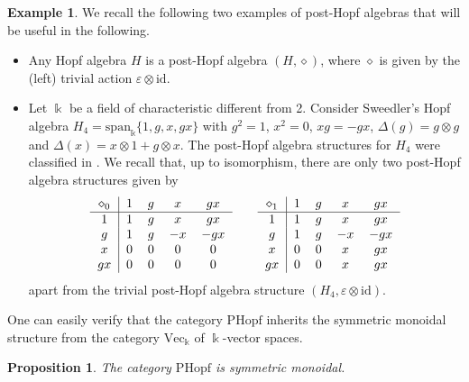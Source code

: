 \documentclass[10pt]{article}
\newtheorem {proposition} [lemma] {Proposition}
\theoremstyle{definition}
\newtheorem{example}[lemma]{Example}
\renewcommand{\wp}{\diamond}
\newcommand{\ot}{\otimes}
\begin{document}
\begin{example}\label{ex:SweedlerpostHopf}
We recall the following two examples of post-Hopf algebras that will be useful in the following.
\begin{itemize}
    \item[1)] Any Hopf algebra $H$ is a post-Hopf algebra $(H,\wp)$, where $\wp$ is given by the (left) trivial action $\varepsilon\ot\mathrm{id}$. %
    \item[2)] Let $\Bbbk$ be a field of characteristic different from 2. Consider Sweedler's Hopf algebra $H_4=\mathrm{span}_\Bbbk\{1,g,x,gx\}$ with $g^2=1$, $x^2=0$, $xg=-gx$, $\Delta(g)=g\otimes g$ and $\Delta(x)=x\otimes 1+g\otimes x$. The post-Hopf algebra structures for $H_{4}$ were classified in \cite[Example 2.12]{LST}. We recall that, up to isomorphism, there are only two post-Hopf algebra structures given by
    \[
\begin{tabular}{c|cccc}
    $\wp_{0}$& $1$ & $g$ & $x$ & $gx$\\ \hline
    $1$ & $1$ & $g$ & $x$ & $gx$ \\ 
    $g$ & $1$ & $g$ & $-x$ & $-gx$ \\ 
    $x$ & $0$ & $0$ & $0$ & $0$ \\ 
    $gx$ & $0$ & $0$ & $0$ & $0$ \\ 
\end{tabular}\qquad
\begin{tabular}{c|cccc}
    $\wp_{1}$& $1$ & $g$ & $x$ & $gx$\\ \hline
    $1$ & $1$ & $g$ & $x$ & $gx$ \\ 
    $g$ & $1$ & $g$ & $-x$ & $-gx$ \\ 
    $x$ & $0$ & $0$ & $x$ & $gx$ \\ 
    $gx$ & $0$ & $0$ & $x$ & $gx$ \\ 
\end{tabular}
\]
apart from the trivial post-Hopf algebra structure $(H_{4},\varepsilon\ot\mathrm{id})$.
\end{itemize}
\end{example}
One can easily verify that the category $\mathrm{PHopf}$ inherits the symmetric monoidal structure from the category $\mathrm{Vec}_{\Bbbk}$ of $\Bbbk$-vector spaces.
\begin{proposition}\label{prop:PHopfbraided}
The category $\mathrm{PHopf}$ is symmetric monoidal.
\end{proposition}
\end{document}
